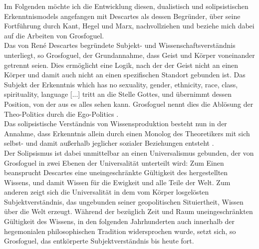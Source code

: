 \noindent Im Folgenden möchte ich die Entwicklung diesen, dualistisch und solipsistischen
Erkenntnismodels angefangen mit Descartes als dessen Begründer, über seine
Fortführung durch Kant, Hegel und Marx, nachvollziehen und beziehe mich dabei
auf die Arbeiten von Grosfoguel.\\

Das von René Descartes begründete Subjekt-
und Wissenschaftsverständnis unterliegt, so Grosfoguel, der Grundannahme, dass
Geist und Körper voneinander getrennt seien. Dies ermöglicht eine Logik, nach
der der Geist nicht an einen Körper und damit auch nicht an einen spezifischen
Standort gebunden ist. \footnotemark {}
Das Subjekt der Erkenntnis  \glqq [...]which has no
sexuality, gender, ethnicity, race, class, spirituality, language [...] \grqq
\footnotemark {} tritt an die Stelle
Gottes, und übernimmt dessen Position, von der aus es alles sehen kann.
Grosfoguel nennt dies die Ablösung der  \glqq Theo-Politics \grqq \footnotemark
{} durch die
\glqq Ego-Politics \grqq. \footnotemark {}\\
Das solipsistische Verständnis von Wissensproduktion besteht nun in der
Annahme, dass Erkenntnis allein durch einen Monolog des Theoretikers mit sich
selbst- und damit außerhalb jeglicher sozialer Beziehungen entsteht
\footnotemark {}.\\

\noindent Der Solipsismus ist dabei unmittelbar an einen Universalismus gebunden, der von
Grosfoguel in zwei Ebenen der Universalität unterteilt wird: Zum Einen
beansprucht Descartes eine uneingeschränkte Gültigkeit des hergestellten
Wissens, und damit Wissen für die Ewigkeit und alle Teile der Welt. Zum anderen
zeigt sich die Universalität in dem vom Körper losgelösten Subjektverständnis,
das ungebunden seiner geopolitischen Situiertheit, Wissen über die Welt
erzeugt. Während der bezüglich Zeit und Raum  uneingeschränkten Gültigkeit des
Wissens, in den folgenden Jahrhunderten auch innerhalb der hegemonialen
philosophischen Tradition widersprochen wurde, setzt sich, so Grosfoguel, das
entkörperte Subjektverständnis bis heute fort.\\

